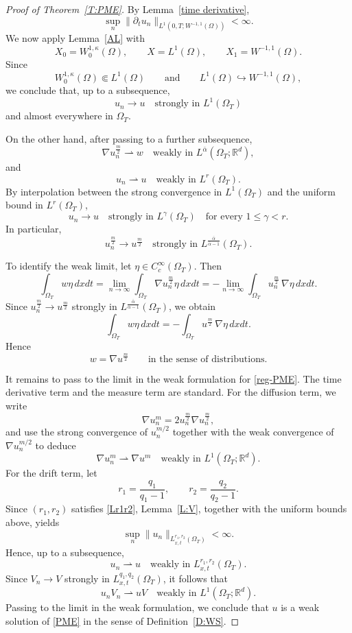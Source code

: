 \documentclass{amsart}
\numberwithin{equation}{section}
\begin{document}
\begin{proof}[Proof of Theorem~\ref{T:PME}]
By Lemma~\ref{time derivative},
\[
\sup_n \|\partial_t u_n\|_{L^1(0,T;W^{-1,1}(\Omega))}<\infty.
\]
We now apply Lemma~\ref{AL} with
\[
X_0=W_0^{1,\kappa}(\Omega), \qquad X=L^1(\Omega), \qquad X_1=W^{-1,1}(\Omega).
\]
Since
\[
W_0^{1,\kappa}(\Omega)\Subset L^1(\Omega)
\qquad \text{and} \qquad
L^1(\Omega)\hookrightarrow W^{-1,1}(\Omega),
\]
we conclude that, up to a subsequence,
\[
u_n \to u
\quad \text{strongly in } L^1(\Omega_T)
\]
and almost everywhere in $\Omega_T$.

On the other hand, after passing to a further subsequence,
\[
\nabla u_n^{\frac m2}\rightharpoonup w
\quad \text{weakly in } L^{\bar\alpha}(\Omega_T;\mathbb R^d),
\]
and
\[
u_n \rightharpoonup u
\quad \text{weakly in } L^r(\Omega_T).
\]
By interpolation between the strong convergence in $L^1(\Omega_T)$ and the uniform bound in $L^r(\Omega_T)$,
\[
u_n \to u
\quad \text{strongly in } L^\gamma(\Omega_T)
\quad \text{for every } 1\le \gamma<r.
\]
In particular,
\[
u_n^{\frac m2}\to u^{\frac m2}
\quad \text{strongly in } L^{\frac{\bar\alpha}{\bar\alpha-1}}(\Omega_T).
\]

To identify the weak limit, let $\eta\in C_c^\infty(\Omega_T)$. Then
\[
\int_{\Omega_T} w \eta\,dxdt
=
\lim_{n\to\infty}
\int_{\Omega_T}\nabla u_n^{\frac m2}\eta\,dxdt
=
-\lim_{n\to\infty}
\int_{\Omega_T}u_n^{\frac m2}\,\nabla\eta\,dxdt.
\]
Since $u_n^{\frac m2}\to u^{\frac m2}$ strongly in $L^{\frac{\bar\alpha}{\bar\alpha-1}}(\Omega_T)$, we obtain
\[
\int_{\Omega_T} w\eta\,dxdt
=
-\int_{\Omega_T}u^{\frac m2}\,\nabla\eta\,dxdt.
\]
Hence
\[
w=\nabla u^{\frac m2}
\qquad \text{in the sense of distributions.}
\]

It remains to pass to the limit in the weak formulation for \eqref{reg-PME}. The time derivative term and the measure term are standard. For the diffusion term, we write
\[
\nabla u_n^m = 2u_n^{\frac m2}\nabla u_n^{\frac m2},
\]
and use the strong convergence of $u_n^{m/2}$ together with the weak convergence of $\nabla u_n^{m/2}$ to deduce
\[
\nabla u_n^m \rightharpoonup \nabla u^m
\quad \text{weakly in } L^1(\Omega_T;\mathbb R^d).
\]
For the drift term, let
\[
r_1=\frac{q_1}{q_1-1},
\qquad
r_2=\frac{q_2}{q_2-1}.
\]
Since $(r_1,r_2)$ satisfies \eqref{Lr1r2}, Lemma~\ref{L:V}, together with the uniform bounds above, yields
\[
\sup_n \|u_n\|_{L_{x,t}^{r_1,r_2}(\Omega_T)}<\infty.
\]
Hence, up to a subsequence,
\[
u_n \rightharpoonup u
\quad \text{weakly in } L_{x,t}^{r_1,r_2}(\Omega_T).
\]
Since $V_n\to V$ strongly in $L_{x,t}^{q_1,q_2}(\Omega_T)$, it follows that
\[
u_nV_n \rightharpoonup uV
\quad \text{weakly in } L^1(\Omega_T;\mathbb R^d).
\]
Passing to the limit in the weak formulation, we conclude that $u$ is a weak solution of \eqref{PME} in the sense of Definition~\ref{D:WS}.
\end{proof}
\end{document}
